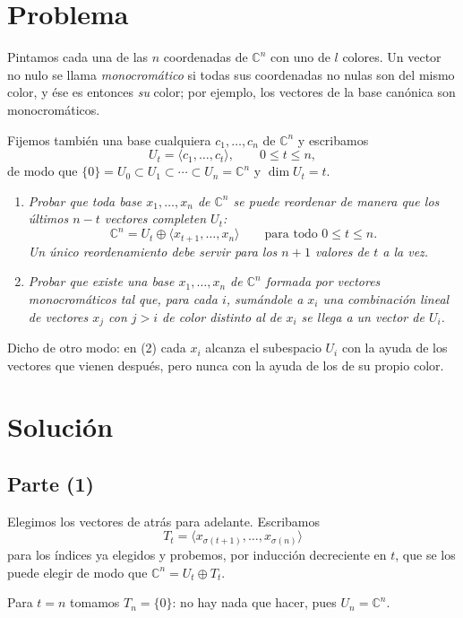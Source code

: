 \documentclass[11pt]{amsproc}
\newcommand{\C}{\mathbb{C}}
\newcommand{\gen}[1]{\langle #1\rangle}
\begin{document}
\section*{Problema}

Pintamos cada una de las $n$ coordenadas de $\C^n$ con uno de $l$ colores. Un vector
no nulo se llama \emph{monocromático} si todas sus coordenadas no nulas son del mismo
color, y ése es entonces \emph{su} color; por ejemplo, los vectores de la base
canónica son monocromáticos.

Fijemos también una base cualquiera $c_1,\dots,c_n$ de $\C^n$ y escribamos
\[
  U_t=\gen{c_1,\dots,c_t},\qquad 0\le t\le n,
\]
de modo que $\{0\}=U_0\subset U_1\subset\cdots\subset U_n=\C^n$ y $\dim U_t=t$.

\begin{enumerate}
  \item\itshape Probar que toda base $x_1,\dots,x_n$ de $\C^n$ se puede reordenar de
        manera que los últimos $n-t$ vectores completen $U_t$:
        \[
          \C^n=U_t\oplus\gen{x_{t+1},\dots,x_n}\qquad\text{para todo } 0\le t\le n .
        \]
        Un único reordenamiento debe servir para los $n+1$ valores de $t$ a la vez.
  \item\itshape Probar que existe una base $x_1,\dots,x_n$ de $\C^n$ formada por
        vectores monocromáticos tal que, para cada $i$, sumándole a $x_i$ una
        combinación lineal de vectores $x_j$ con $j>i$ \emph{de color distinto al de
        $x_i$} se llega a un vector de $U_i$.
\end{enumerate}
 
Dicho de otro modo: en (2) cada $x_i$ alcanza el subespacio $U_i$ con la ayuda de los
vectores que vienen después, pero nunca con la ayuda de los de su propio color.

\section*{Solución}

\subsection*{Parte (1)}

Elegimos los vectores de atrás para adelante. Escribamos
\[
  T_t=\gen{x_{\sigma(t+1)},\dots,x_{\sigma(n)}}
\]
para los índices ya elegidos y
probemos, por inducción decreciente en $t$, que se los puede elegir de modo que
$\C^n=U_t\oplus T_t$.

Para $t=n$ tomamos $T_n=\{0\}$: no hay nada que hacer, pues $U_n=\C^n$.
\end{document}
